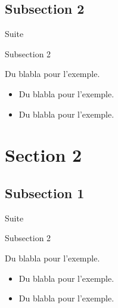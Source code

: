 \documentclass[french,12pt,]{beamer}
\begin{document}
\subsection{Subsection 2}
\begin{frame}{Suite}
  \begin{block}{Subsection 2}
    \begin{center}
      Du blabla pour l'exemple.
      \begin{itemize}
        \item Du blabla pour l'exemple.
        \item Du blabla pour l'exemple.
      \end{itemize}
        \end{center}
  \end{block}
\end{frame}

\section{Section 2}
\subsection{Subsection 1}
\begin{frame}{Suite}
  \begin{block}{Subsection 2}
    \begin{center}
      Du blabla pour l'exemple.
      \begin{itemize}
        \item Du blabla pour l'exemple.
        \item Du blabla pour l'exemple.
      \end{itemize}
        \end{center}
  \end{block}
\end{frame}
\end{document}
